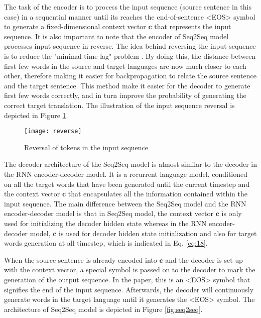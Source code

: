 \documentclass[12pt]{extarticle}
\begin{document}
The task of the encoder is to process the input sequence (source sentence in this case) in a sequential manner until its reaches the end-of-sentence \textless EOS\textgreater{} symbol to generate a fixed-dimensional context vector $\textbf{c}$ that represents the input sequence. It is also important to note that the encoder of Seq2Seq model processes input sequence in reverse. The idea behind reversing the input sequence is to reduce the "minimal time lag" problem \citep{Hochreiter:1996:LSH:2998981.2999048}. By doing this, the distance between first few words in the source and target languages are now much closer to each other, therefore making it easier for backpropagation to relate the source sentence and the target sentence. This method make it easier for the decoder to generate first few words correctly, and in turn improve the probability of generating the correct target translation. The illustration of the input sequence reversal is depicted in Figure \ref{fig:reverse}.

\begin{figure}[ht]
\centering
\texttt{[image: reverse]}
\caption{Reversal of tokens in the input sequence}
\label{fig:reverse}
\end{figure}

The decoder architecture of the Seq2Seq model is almost similar to the decoder in the RNN encoder-decoder model. It is a recurrent language model, conditioned on all the target words that have been generated until the current timestep and the context vector $\textbf{c}$ that encapsulates all the information contained within the input sequence. The main difference between the Seq2Seq model and the RNN encoder-decoder model is that in Seq2Seq model, the context vector $\textbf{c}$ is only used for initializing the decoder hidden state whereas in the RNN encoder-decoder model, $\textbf{c}$ is used for decoder hidden state initialization and also for target words generation at all timestep, which is indicated in Eq. \ref{eq:18}. 

When the source sentence is already encoded into $\textbf{c}$ and the decoder is set up with the context vector, a special symbol is passed on to the decoder to mark the generation of the output sequence. In the paper, this is an \textless EOS\textgreater{} symbol that signifies the end of the input sequence. Afterwards, the decoder will continuously generate words in the target language until it generates the \textless EOS\textgreater{} symbol. The architecture of Seq2Seq model is depicted in Figure \ref{fig:seq2seq}.
\end{document}
